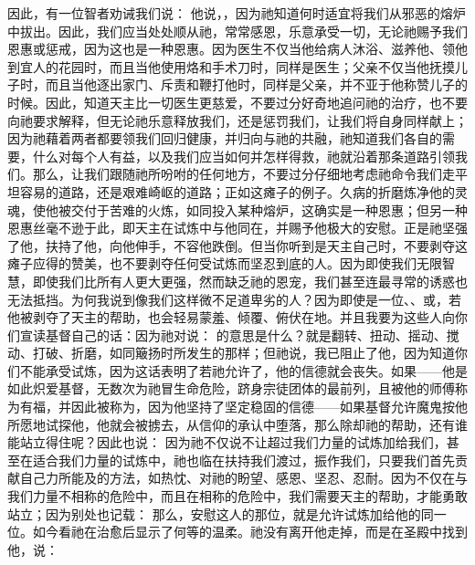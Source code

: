 因此，有一位智者劝诫我们说：  他说，，因为祂知道何时适宜将我们从邪恶的熔炉中拔出。因此，我们应当处处顺从祂，常常感恩，乐意承受一切，无论祂赐予我们恩惠或惩戒，因为这也是一种恩惠。因为医生不仅当他给病人沐浴、滋养他、领他到宜人的花园时，而且当他使用烙和手术刀时，同样是医生；父亲不仅当他抚摸儿子时，而且当他逐出家门、斥责和鞭打他时，同样是父亲，并不亚于他称赞儿子的时候。因此，知道天主比一切医生更慈爱，不要过分好奇地追问祂的治疗，也不要向祂要求解释，但无论祂乐意释放我们，还是惩罚我们，让我们将自身同样献上；因为祂藉着两者都要领我们回归健康，并归向与祂的共融，祂知道我们各自的需要，什么对每个人有益，以及我们应当如何并怎样得救，祂就沿着那条道路引领我们。那么，让我们跟随祂所吩咐的任何地方，不要过分仔细地考虑祂命令我们走平坦容易的道路，还是艰难崎岖的道路；正如这瘫子的例子。久病的折磨炼净他的灵魂，使他被交付于苦难的火炼，如同投入某种熔炉，这确实是一种恩惠；但另一种恩惠丝毫不逊于此，即天主在试炼中与他同在，并赐予他极大的安慰。正是祂坚强了他，扶持了他，向他伸手，不容他跌倒。但当你听到是天主自己时，不要剥夺这瘫子应得的赞美，也不要剥夺任何受试炼而坚忍到底的人。因为即使我们无限智慧，即使我们比所有人更大更强，然而缺乏祂的恩宠，我们甚至连最寻常的诱惑也无法抵挡。为何我说到像我们这样微不足道卑劣的人？因为即使是一位、、或，若他被剥夺了天主的帮助，也会轻易蒙羞、倾覆、俯伏在地。并且我要为这些人向你们宣读基督自己的话：因为祂对说：  的意思是什么？就是翻转、扭动、摇动、搅动、打破、折磨，如同簸扬时所发生的那样；但祂说，我已阻止了他，因为知道你们不能承受试炼，因为这话表明了若祂允许了，他的信德就会丧失。如果——他是如此炽爱基督，无数次为祂冒生命危险，跻身宗徒团体的最前列，且被他的师傅称为有福，并因此被称为，因为他坚持了坚定稳固的信德——如果基督允许魔鬼按他所愿地试探他，他就会被掳去，从信仰的承认中堕落，那么除却祂的帮助，还有谁能站立得住呢？因此也说：  因为祂不仅说不让超过我们力量的试炼加给我们，甚至在适合我们力量的试炼中，祂也临在扶持我们渡过，振作我们，只要我们首先贡献自己力所能及的方法，如热忱、对祂的盼望、感恩、坚忍、忍耐。因为不仅在与我们力量不相称的危险中，而且在相称的危险中，我们需要天主的帮助，才能勇敢站立；因为别处也记载： 那么，安慰这人的那位，就是允许试炼加给他的同一位。如今看祂在治愈后显示了何等的温柔。祂没有离开他走掉，而是在圣殿中找到他，说：  